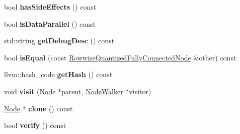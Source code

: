 \begin{DoxyCompactItemize}
\item 
\mbox{\label{classglow_1_1_rowwise_quantized_fully_connected_node_a7e807c11b725ac54219bb4819e9aa7ff}} 
bool {\bfseries has\+Side\+Effects} () const
\item 
\mbox{\label{classglow_1_1_rowwise_quantized_fully_connected_node_acdf00900d0e1fdb38353aa09e35ae394}} 
bool {\bfseries is\+Data\+Parallel} () const
\item 
\mbox{\label{classglow_1_1_rowwise_quantized_fully_connected_node_ab97e67f737396f99d322fd816050c00d}} 
std\+::string {\bfseries get\+Debug\+Desc} () const
\item 
\mbox{\label{classglow_1_1_rowwise_quantized_fully_connected_node_ad3ac355e731d399f812d2e579493fa80}} 
bool {\bfseries is\+Equal} (const \hyperlink{classglow_1_1_rowwise_quantized_fully_connected_node}{Rowwise\+Quantized\+Fully\+Connected\+Node} \&other) const
\item 
\mbox{\label{classglow_1_1_rowwise_quantized_fully_connected_node_a7ee902c461de51b053635f5dda4d1423}} 
llvm\+::hash\+\_\+code {\bfseries get\+Hash} () const
\item 
\mbox{\label{classglow_1_1_rowwise_quantized_fully_connected_node_a8506e4cc775fde4019505e07696eac15}} 
void {\bfseries visit} (\hyperlink{classglow_1_1_node}{Node} $\ast$parent, \hyperlink{classglow_1_1_node_walker}{Node\+Walker} $\ast$visitor)
\item 
\mbox{\label{classglow_1_1_rowwise_quantized_fully_connected_node_a7aed7d753ede757d74cf179de194d828}} 
\hyperlink{classglow_1_1_node}{Node} $\ast$ {\bfseries clone} () const
\item 
\mbox{\label{classglow_1_1_rowwise_quantized_fully_connected_node_a0123a6b04076ca55872d5d7c3bc114f6}} 
bool {\bfseries verify} () const
\end{DoxyCompactItemize}
